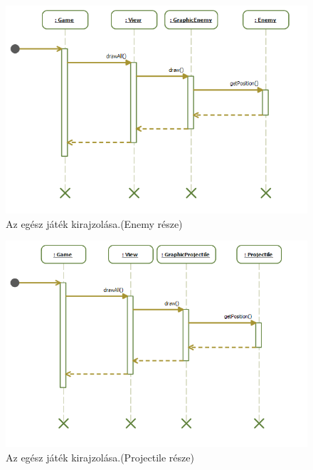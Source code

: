 \begin{figure}[H]
\begin{center}
\includegraphics[width=18cm]{images/grafikaSeq/step4.png}
\caption{Az egész játék kirajzolása.(Enemy része)}
\label{fig:Graphic_drawAll_Enemy}
\end{center}
\end{figure}

\begin{figure}[H]
\begin{center}
\includegraphics[width=18cm]{images/grafikaSeq/step5.png}
\caption{Az egész játék kirajzolása.(Projectile része)}
\label{fig:Graphic_drawAll_Projectile}
\end{center}
\end{figure}

